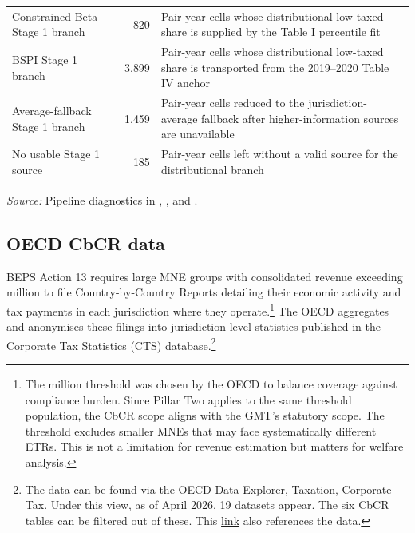 \documentclass[11pt,a4paper]{article}
\newcommand{\EUR}{\texteuro}
\begin{document}
\begin{table}[H]
\begin{tabularx}{\textwidth}{@{}L{4.7cm}rX@{}}
Constrained-Beta Stage 1 branch & 820 & Pair-year cells whose distributional low-taxed share is supplied by the Table I percentile fit \\
BSPI Stage 1 branch & 3{,}899 & Pair-year cells whose distributional low-taxed share is transported from the 2019--2020 Table IV anchor \\
Average-fallback Stage 1 branch & 1{,}459 & Pair-year cells reduced to the jurisdiction-average fallback after higher-information sources are unavailable \\
No usable Stage 1 source & 185 & Pair-year cells left without a valid source for the distributional branch \\
\bottomrule
\end{tabularx}
\begin{flushleft}
\footnotesize\textit{Source:} Pipeline diagnostics in , , and .
\end{flushleft}
\end{table}

\subsection{OECD CbCR data}\label{CbCR}

BEPS Action 13 requires large MNE groups with consolidated revenue exceeding \EUR750 million to file Country-by-Country Reports detailing their economic activity and tax payments in each jurisdiction where they operate.\footnote{The \EUR750 million threshold was chosen by the OECD to balance coverage against compliance burden. Since Pillar Two applies to the same threshold population, the CbCR scope aligns with the GMT's statutory scope. The threshold excludes smaller MNEs that may face systematically different ETRs. This is not a limitation for revenue estimation but matters for welfare analysis.} The OECD aggregates and anonymises these filings into jurisdiction-level statistics published in the Corporate Tax Statistics (CTS) database.\footnote{The data can be found via the OECD Data Explorer, Taxation, Corporate Tax. Under this view, as of April 2026, 19 datasets appear. The six CbCR tables can be filtered out of these. This \href{https://data-explorer.oecd.org/?fs\%5B0\%5D=Topic\%2C1\%7CTaxation\%23TAX\%23\%7CCorporate\%20tax\%23TAX_CPT\%23&pg=0&fc=Topic&bp=true&snb=19}{link} also references the data.}
\end{document}
